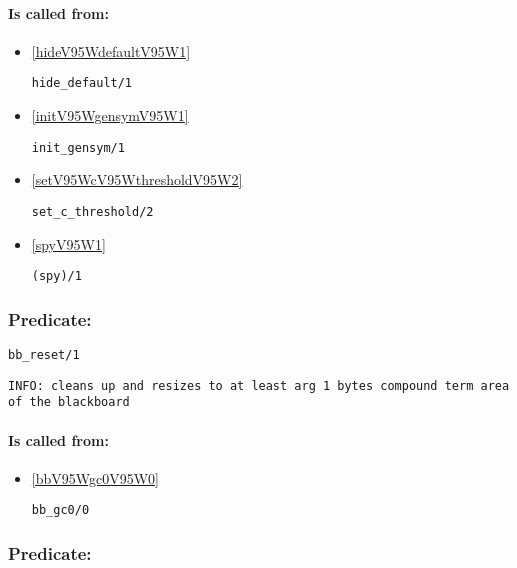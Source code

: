 \paragraph{Is called from:} 
\begin{itemize}
\item \ref{hideV95WdefaultV95W1} 
\begin{verbatim}
hide_default/1
\end{verbatim}

\item \ref{initV95WgensymV95W1} 
\begin{verbatim}
init_gensym/1
\end{verbatim}

\item \ref{setV95WcV95WthresholdV95W2} 
\begin{verbatim}
set_c_threshold/2
\end{verbatim}

\item \ref{spyV95W1} 
\begin{verbatim}
(spy)/1
\end{verbatim}

\end{itemize}

\subsubsection{Predicate:} \label{bbV95WresetV95W1}

\begin{verbatim}
bb_reset/1
\end{verbatim}

{\small \begin{verbatim}
INFO: cleans up and resizes to at least arg 1 bytes compound term area of the blackboard

\end{verbatim}}
\paragraph{Is called from:} 
\begin{itemize}
\item \ref{bbV95Wgc0V95W0} 
\begin{verbatim}
bb_gc0/0
\end{verbatim}

\end{itemize}

\subsubsection{Predicate:} \label{bbV95WrmV95W2}

